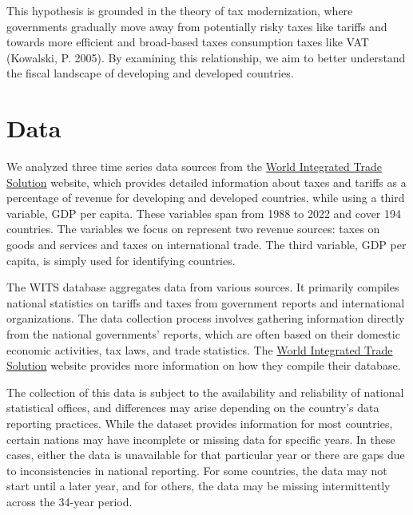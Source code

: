 \documentclass[12pt]{article}
\begin{document}
This hypothesis is grounded in the theory of tax modernization, where governments gradually move away from potentially risky taxes like tariffs and towards more efficient and broad-based taxes consumption taxes like VAT (Kowalski, P. 2005). By examining this relationship, we aim to better understand the fiscal landscape of developing and developed countries.

\section{Data}
\label{sec:data}

We analyzed three time series data sources from the \href{https://wits.worldbank.org/CountryProfile/en/Country/BY-COUNTRY/StartYear/1988/EndYear/2022/Indicator/GC-TAX-GSRV-VA-ZS}{World Integrated Trade Solution} website, which provides detailed information about taxes and tariffs as a percentage of revenue for developing and developed countries, while using a third variable, GDP per capita. These variables span from 1988 to 2022 and cover 194 countries. The variables we focus on represent two revenue sources: taxes on goods and services and taxes on international trade. The third variable, GDP per capita, is simply used for identifying countries.

The WITS database aggregates data from various sources. It primarily compiles national statistics on tariffs and taxes from government reports and international organizations. The data collection process involves gathering information directly from the national governments' reports, which are often based on their domestic economic activities, tax laws, and trade statistics. The \href{https://wits.worldbank.org/CountryProfile/en/Country/BY-COUNTRY/StartYear/1988/EndYear/2022/Indicator/GC-TAX-GSRV-VA-ZS}{World Integrated Trade Solution} website provides more information on how they compile their database.

The collection of this data is subject to the availability and reliability of national statistical offices, and differences may arise depending on the country’s data reporting practices. While the dataset provides information for most countries, certain nations may have incomplete or missing data for specific years. In these cases, either the data is unavailable for that particular year or there are gaps due to inconsistencies in national reporting. For some countries, the data may not start until a later year, and for others, the data may be missing intermittently across the 34-year period.
\end{document}
